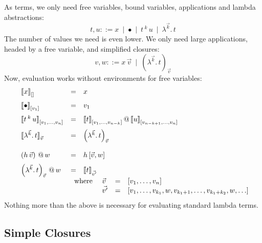 \documentclass[12pt, a4paper, titlepage]{article}
\makeatletter
\newcommand{\ovar}{\mathord{\bullet}}
\newcommand{\sspace}{\,}
\newcommand{\la}{\lambda}
\newcommand{\emptyVec}{[]}
\newcommand{\ve}[1]{[#1]}
\newcommand{\ApO}[3]{#1 \sspace ^{#2} \sspace #3}
\newcommand{\oapp}[1]{\sspace ^{#1} \sspace}
\newcommand{\LaO}[2]{\la ^{#1} . \sspace #2}
\newcommand{\ClosO}[4]{\left(\la^{#1} . \sspace {#2} \right)^{#3}_{#4}}
\newcommand{\pa}[1]{\left( #1 \right)}
\newcommand{\ev}[3]{\llbracket{#1}\rrbracket^{#2}_{#3}}
\newcommand{\ap}{\,@\,}
\makeatother
\begin{document}
As terms, we only need free variables, bound variables, applications and lambda abstractions:
\[
 t, u ::= x \ \mid \ \ovar \ \mid \ \ApO t k u \ \mid \ \LaO {\vec k} t
\]
The number of values we need is even lower. We only need large applications, headed by a free variable, and simplified closures: 
\[
 v, w ::= x \, \vec v \ \mid \ \ClosO{\vec k}{t}{}{\vec v}
\]
Now, evaluation works without environments for free variables:
\[ 
\begin{array}{llll}
& \ev x {} {\emptyVec} & = & x \\ \noalign{\medskip}
& \ev \ovar {} {\ve{v_1}} & = & v_1 \\  \noalign{\medskip}
& \ev {t \oapp k u}  {} {\ve{v_1, \ldots, v_n}} & = & {\ev t  {} {\ve{v_1, \ldots, v_{n-k}}}} \ap {\ev u  {} {\ve{v_{n-k+1}, \ldots, v_n}}} \\  \noalign{\medskip}
& \ev {\LaO {\vec k} t}  {} {\vec v} & = & \ClosO {\vec k} t {} {\vec v} \\  
\\ 
& \pa{h \sspace \vec v} \ap w & = & h \sspace \ve{\vec v, w} 
\\ \noalign{\medskip}
& \ClosO {\vec k} t {}{\vec v}    \ap  w & = & \ev t {} {\vec {v'}}   \\
&& 
  \multicolumn 2 l{
  \begin{array}{llcl}
  \mbox{where } & \vec v & = & \ve{v_1, \ldots, v_n} \\
                & \vec {v'} & = & \ve{v_1, \ldots, v_{k_1}, w, v_{k_1+1}, \ldots, v_{k_1+k_2}, w, \ldots }
  \end{array}
  }
\end{array}
\]
Nothing more than the above is necessary for evaluating standard lambda terms. 





\subsection{Simple Closures} 
\end{document}
